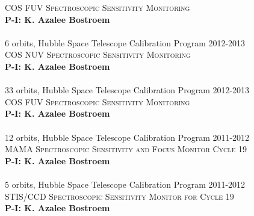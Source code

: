 \documentclass[10pt]{cv}
\begin{document}
\begin{llist}
\textsc{COS FUV Spectroscopic Sensitivity Monitoring}\\
{\bf P-I: K. Azalee Bostroem} \\ %
\\
6 orbits, Hubble Space Telescope Calibration Program \hfill 2012-2013\\ %
\textsc{COS NUV Spectroscopic Sensitivity Monitoring}\\
{\bf P-I: K. Azalee Bostroem} \\ %
\\
33 orbits, Hubble Space Telescope Calibration Program \hfill 2012-2013\\ %
\textsc{COS FUV Spectroscopic Sensitivity Monitoring}\\
{\bf P-I: K. Azalee Bostroem} \\ %
\\
12 orbits, Hubble Space Telescope Calibration Program \hfill 2011-2012\\ %
\textsc{MAMA Spectroscopic Sensitivity and Focus Monitor Cycle 19}\\
{\bf P-I: K. Azalee Bostroem} \\ %
\\
5 orbits, Hubble Space Telescope Calibration Program \hfill 2011-2012\\ %
\textsc{STIS/CCD Spectroscopic Sensitivity Monitor for Cycle 19}\\
{\bf P-I: K. Azalee Bostroem} \\ %


\end{llist}
\end{document}
